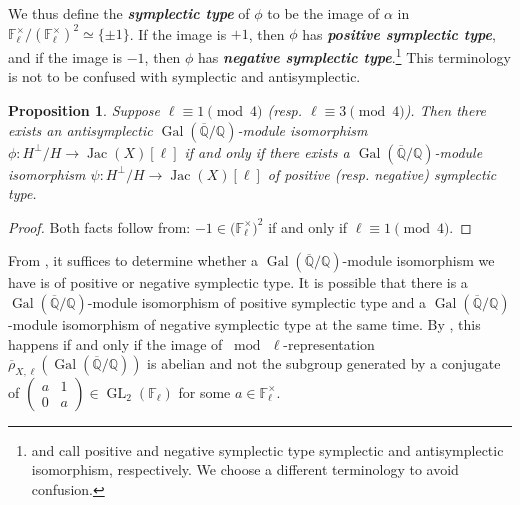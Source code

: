 \documentclass{amsproc}
\numberwithin{equation}{section}
\newtheorem{proposition}[equation]{Proposition}
\theoremstyle{definition}
\theoremstyle{remark}
\newcommand{\vocab}[1]{\textbf{\textit{\boldmath #1}}}
\DeclareMathOperator{\Jac}{Jac}
\DeclareMathOperator{\GL}{GL}
\DeclareMathOperator{\Gal}{Gal}
\newcommand{\QQ}{\mathbb Q}
\newcommand{\FF}{\mathbb F}
\newcommand{\Qbar}{\overline{\QQ}}
\newcommand{\GalQ}{\Gal(\Qbar/\QQ)}
\newcommand{\ttwomatrix}[4]{\left(\begin{smallmatrix} #1 & #2 \\ #3 & #4\end{smallmatrix}\right)}
\begin{document}
We thus define the \vocab{symplectic type} of $\phi$ to be the image of $\alpha$ in $\FF_\ell^\times / (\FF_\ell^\times)^2 \simeq \{\pm 1\}$. If the image is $+1$, then $\phi$ has \vocab{positive symplectic type}, and if the image is $-1$, then $\phi$ has \vocab{negative symplectic type}.\footnote{\cite{local_symplectic_type} and \cite{global_symplectic_type} call positive and negative symplectic type symplectic and antisymplectic isomorphism, respectively. We choose a different terminology to avoid confusion.} 
This terminology is not to be confused with symplectic and antisymplectic.
\begin{proposition}
    \label{prop:positive_negative_symplectic}
    Suppose $\ell\equiv 1\pmod 4$ (resp. $\ell\equiv 3\pmod 4$).
    Then there exists an antisymplectic $\GalQ$-module isomorphism $\phi : H^\perp/H\to \Jac(X)[\ell]$ if and only if there exists a $\GalQ$-module isomorphism $\psi : H^\perp/H \to \Jac(X)[\ell]$  of positive (resp. negative) symplectic type.
\end{proposition}
\begin{proof}
    Both facts follow from: $-1\in\mathbb (\FF_\ell^\times)^2$ if and only if $\ell\equiv 1\pmod 4$.
\end{proof}
From , it suffices to determine whether a $\GalQ$-module isomorphism we have is of positive or negative symplectic type. It is possible that there is a $\GalQ$-module isomorphism of positive symplectic type and a $\GalQ$-module isomorphism of negative symplectic type at the same time. By \cite[Thm.~15]{local_symplectic_type}, this happens if and only if the image of $\bmod\,\ell$-representation $\overline\rho_{X,\ell}(\GalQ)$ is abelian and not the subgroup generated by a conjugate of $\ttwomatrix a10a \in \GL_2(\FF_\ell)$ for some $a\in\FF_\ell^\times$.
\end{document}
